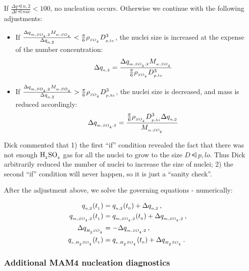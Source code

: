 If $\frac{\Delta q\dsub{n,2}}{\Delta t\dsub{nuc}} < 100$, no nucleation occurs.
Otherwise we continue with the following adjustments:

\begin{itemize}
  \item If $\frac{\Delta q_{_{m,SO_{_4},2}} M_{_{w,SO_{_4}}}}{\Delta q_{_{n,2}}} <
        \frac{\pi}{6} \rho_{_{SO_{_4}}} D_{_{p,lo}}^3$, the nuclei size is
        increased at the expense of the number concentration:
        $$\Delta q_{_{n,2}} = \frac{\Delta q_{_{m,SO_{_4},2}} M_{_{w,SO_{_4}}}}{\frac{\pi}{6} \rho_{_{SO_{_4}}} D_{_{p,lo}}^3}$$
  \item If $\frac{\Delta q_{_{m,SO_{_4},2}} M_{_{w,SO_{_4}}}}{\Delta q_{_{n,2}}} >
        \frac{\pi}{6} \rho_{_{SO_{_4}}} D_{_{p,hi}}^3$, the nuclei size is
        decreased, and mass is reduced accordingly:
        $$\Delta q_{_{m,SO_{_4},2}} = \frac{\frac{\pi}{6} \rho_{_{SO_{_4}}} D_{_{p,hi}}^3 \Delta q_{_{n,2}}}{M_{_{w,SO_{_4}}}}$$
\end{itemize}


Dick commented that 1) the first ``if'' condition revealed the fact that
there was not enough $\rm H_{_2}SO_{_4}$ gas for all the nuclei to grow to the size
$D\dsub{p,lo}$. Thus Dick arbitrarily reduced the number of nuclei to
increase the size of nuclei; 2) the second ``if'' condition will never
happen, so it is just a ``sanity check''.

After the adjustment above, we solve the governing equations
- numerically:

\begin{align}
  q_{_{n,2}} (t_{_{1}}) &= q_{_{n,2}} (t_{_{0}}) + \Delta q_{_{n,2}} \,, \\
  q_{_{m,SO_{_4},2}} (t_{_{1}}) &= q_{_{m,SO_{_4},2}} (t_{_{0}}) + \Delta q_{_{m,SO_{_4},2}} \,, \\
  \Delta q_{_{H_{_2}SO_{_4}}} &= -\Delta q_{_{m,SO_{_4},2}} \,, \\
  q_{_{v,H_{_2}SO_{_4}}} (t_{_{1}}) &= q_{_{v,H_{_2}SO_{_4}}} (t_{_{0}}) + \Delta q_{_{H_{_2}SO_{_4}}} \,.
\end{align}

\subsubsection{Additional MAM4 nucleation diagnostics} \label{output}

